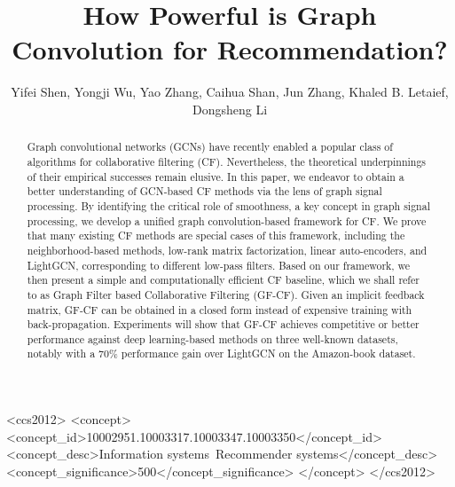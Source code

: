 \documentclass[sigconf]{acmart}
\begin{document}
\fancyhead{}
\title{How Powerful is Graph Convolution for Recommendation?}
 \author{Yifei Shen, Yongji Wu, Yao Zhang, Caihua Shan, Jun Zhang, Khaled B. Letaief, Dongsheng Li
 }




\begin{abstract}
  Graph convolutional networks (GCNs) have recently enabled a popular class of algorithms for collaborative filtering (CF). Nevertheless, the theoretical underpinnings of their empirical successes remain elusive. In this paper, we endeavor to obtain a better understanding of GCN-based CF methods via the lens of graph signal processing. By identifying the critical role of smoothness, a key concept in graph signal processing, we develop a unified graph convolution-based framework for CF. We prove that many existing CF methods are special cases of this framework, including the neighborhood-based methods, low-rank matrix factorization, linear auto-encoders, and LightGCN, corresponding to different low-pass filters. Based on our framework, we then present a simple and computationally efficient CF baseline, which we shall refer to as Graph Filter based Collaborative Filtering (GF-CF). Given an implicit feedback matrix, GF-CF can be obtained in a closed form instead of expensive training with back-propagation. Experiments will show that GF-CF achieves competitive or better performance against deep learning-based methods on three well-known datasets, notably with a $70\%$ performance gain over LightGCN on the Amazon-book dataset.
\end{abstract}

\begin{CCSXML}
<ccs2012>
   <concept>
       <concept_id>10002951.10003317.10003347.10003350</concept_id>
       <concept_desc>Information systems~Recommender systems</concept_desc>
       <concept_significance>500</concept_significance>
       </concept>
 </ccs2012>
\end{CCSXML}


\end{document}
